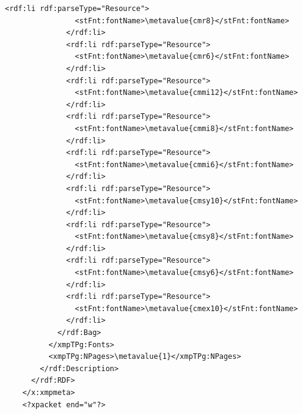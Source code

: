 \begin{Verbatim}[fontsize=\small,commandchars=\\\{\}]
              <rdf:li rdf:parseType="Resource">
                <stFnt:fontName>\metavalue{cmr8}</stFnt:fontName>
              </rdf:li>
              <rdf:li rdf:parseType="Resource">
                <stFnt:fontName>\metavalue{cmr6}</stFnt:fontName>
              </rdf:li>
              <rdf:li rdf:parseType="Resource">
                <stFnt:fontName>\metavalue{cmmi12}</stFnt:fontName>
              </rdf:li>
              <rdf:li rdf:parseType="Resource">
                <stFnt:fontName>\metavalue{cmmi8}</stFnt:fontName>
              </rdf:li>
              <rdf:li rdf:parseType="Resource">
                <stFnt:fontName>\metavalue{cmmi6}</stFnt:fontName>
              </rdf:li>
              <rdf:li rdf:parseType="Resource">
                <stFnt:fontName>\metavalue{cmsy10}</stFnt:fontName>
              </rdf:li>
              <rdf:li rdf:parseType="Resource">
                <stFnt:fontName>\metavalue{cmsy8}</stFnt:fontName>
              </rdf:li>
              <rdf:li rdf:parseType="Resource">
                <stFnt:fontName>\metavalue{cmsy6}</stFnt:fontName>
              </rdf:li>
              <rdf:li rdf:parseType="Resource">
                <stFnt:fontName>\metavalue{cmex10}</stFnt:fontName>
              </rdf:li>
            </rdf:Bag>
          </xmpTPg:Fonts>
          <xmpTPg:NPages>\metavalue{1}</xmpTPg:NPages>
        </rdf:Description>
      </rdf:RDF>
    </x:xmpmeta>
    <?xpacket end="w"?>
\end{Verbatim}
